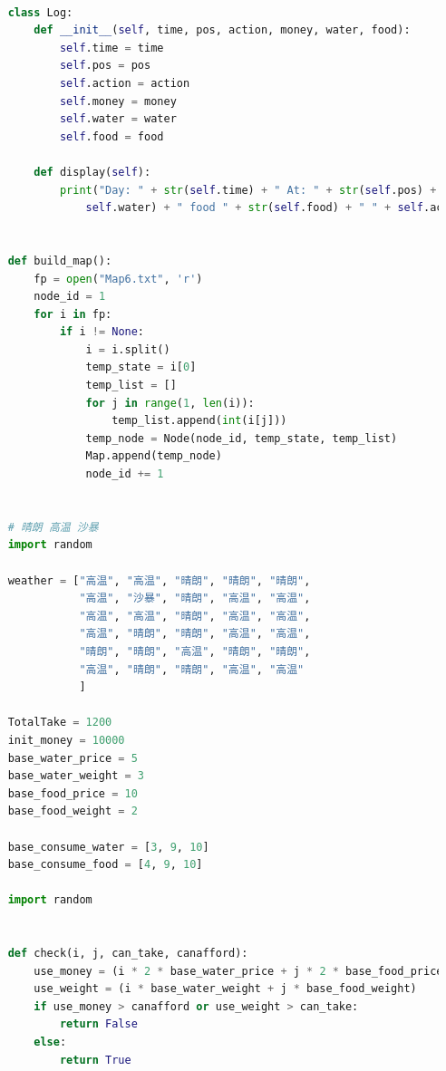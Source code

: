 \documentclass[withoutpreface,bwprint]{cumcmthesis} %
\begin{document}
\begin{appendices}
\begin{lstlisting}[language=python]
    
    class Log:
        def __init__(self, time, pos, action, money, water, food):
            self.time = time
            self.pos = pos
            self.action = action
            self.money = money
            self.water = water
            self.food = food
    
        def display(self):
            print("Day: " + str(self.time) + " At: " + str(self.pos) + " Money: " + str(self.money) + " water " + str(
                self.water) + " food " + str(self.food) + " " + self.action)
    
    
    def build_map():
        fp = open("Map6.txt", 'r')
        node_id = 1
        for i in fp:
            if i != None:
                i = i.split()
                temp_state = i[0]
                temp_list = []
                for j in range(1, len(i)):
                    temp_list.append(int(i[j]))
                temp_node = Node(node_id, temp_state, temp_list)
                Map.append(temp_node)
                node_id += 1
    
    
    # 晴朗 高温 沙暴
    import random
    
    weather = ["高温", "高温", "晴朗", "晴朗", "晴朗",
               "高温", "沙暴", "晴朗", "高温", "高温",
               "高温", "高温", "晴朗", "高温", "高温",
               "高温", "晴朗", "晴朗", "高温", "高温",
               "晴朗", "晴朗", "高温", "晴朗", "晴朗",
               "高温", "晴朗", "晴朗", "高温", "高温"
               ]
    
    TotalTake = 1200
    init_money = 10000
    base_water_price = 5
    base_water_weight = 3
    base_food_price = 10
    base_food_weight = 2
    
    base_consume_water = [3, 9, 10]
    base_consume_food = [4, 9, 10]
    
    import random
    
    
    def check(i, j, can_take, canafford):
        use_money = (i * 2 * base_water_price + j * 2 * base_food_price)
        use_weight = (i * base_water_weight + j * base_food_weight)
        if use_money > canafford or use_weight > can_take:
            return False
        else:
            return True
    

\end{lstlisting}
\end{appendices}
\end{document}
